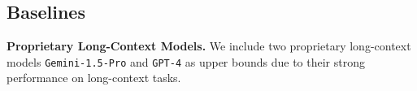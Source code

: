 


\subsection{Baselines}
\textbf{Proprietary Long-Context Models.}
We include two proprietary long-context models \texttt{Gemini-1.5-Pro} and \texttt{GPT-4} as upper bounds due to their strong performance on long-context tasks.

